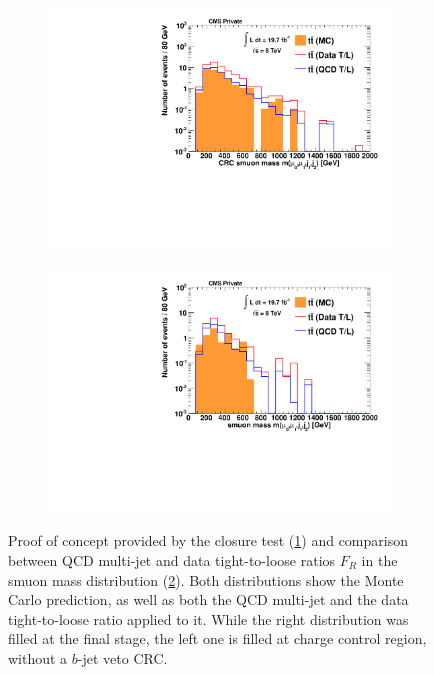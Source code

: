 \begin{figure}
  \centering
  \begin{subfigure}[b]{0.495\textwidth}
    \centering
    \includegraphics[width=\textwidth]{plots/closure_proof.pdf}
    \caption{\label{fig:closureproof}}
  \end{subfigure}
  \begin{subfigure}[b]{0.495\textwidth}
    \centering
    \includegraphics[width=\textwidth]{plots/closure_test.pdf}
    \caption{\label{fig:closurecomparison}}
  \end{subfigure}

  \caption{Proof of concept provided by the closure test (\ref{fig:closureproof}) and comparison between QCD multi-jet and data tight-to-loose ratios $F_R$ in the smuon mass distribution (\ref{fig:closurecomparison}). Both distributions show the Monte Carlo prediction, as well as both the QCD multi-jet and the data tight-to-loose ratio applied to it. While the right distribution was filled at the final stage, the left one is filled at charge control region, without a $b$-jet veto CRC.}
  \label{fig:closuretest}
\end{figure}

